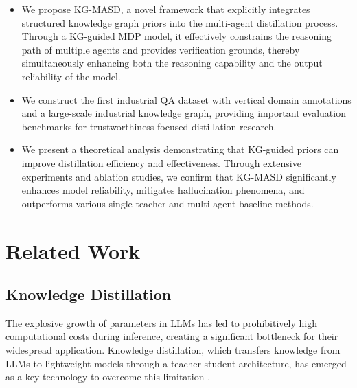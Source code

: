 \documentclass[preprint,12pt]{elsarticle}
\begin{document}
\begin{itemize}
\item We propose KG-MASD, a novel framework that explicitly integrates structured knowledge graph priors into the multi-agent distillation process. Through a KG-guided MDP model, it effectively constrains the reasoning path of multiple agents and provides verification grounds, thereby simultaneously enhancing both the reasoning capability and the output reliability of the model.
\item We construct the first industrial QA dataset with vertical domain annotations and a large-scale industrial knowledge graph, providing important evaluation benchmarks for trustworthiness-focused distillation research.
\item We present a theoretical analysis demonstrating that KG-guided priors can improve distillation efficiency and effectiveness. Through extensive experiments and ablation studies, we confirm that KG-MASD significantly enhances model reliability, mitigates hallucination phenomena, and outperforms various single-teacher and multi-agent baseline methods.
\end{itemize}



\section{Related Work}
\subsection{Knowledge Distillation}

The explosive growth of parameters in LLMs has led to prohibitively high computational costs during inference, creating a significant bottleneck for their widespread application. Knowledge distillation, which transfers knowledge from LLMs to lightweight models through a teacher-student architecture, has emerged as a key technology to overcome this limitation \cite{Hu2024,Du2024,Zhao2024}.
\end{document}
